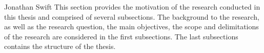 \hfill {}

\hfill Jonathan Swift
\Sentence
This section provides the motivation of the research conducted in this thesis and comprised of 
several subsections.
\Sentence
The background to the research, as well as the research question, the main objectives, the scope 
and delimitations of the research are considered in the first subsections.
\Sentence
The last subsections contains the structure of the thesis.